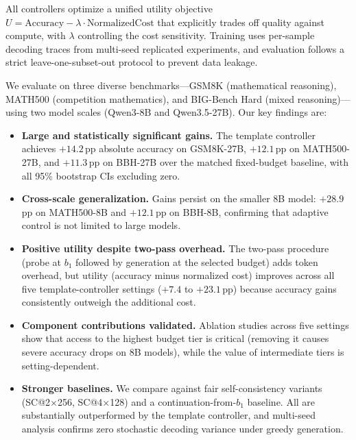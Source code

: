 All controllers optimize a unified utility objective $U = \text{Accuracy} - \lambda \cdot \text{NormalizedCost}$ that explicitly trades off quality against compute, with $\lambda$ controlling the cost sensitivity.
Training uses per-sample decoding traces from multi-seed replicated experiments, and evaluation follows a strict leave-one-subset-out protocol to prevent data leakage.

We evaluate \adathink{} on three diverse benchmarks---GSM8K (mathematical reasoning), MATH500 (competition mathematics), and BIG-Bench Hard (mixed reasoning)---using two model scales (Qwen3-8B and Qwen3.5-27B).
Our key findings are:
\begin{itemize}[nosep,leftmargin=*]
    \item \textbf{Large and statistically significant gains.}
    The template controller achieves $+14.2$\,pp absolute accuracy on GSM8K-27B, $+12.1$\,pp on MATH500-27B, and $+11.3$\,pp on BBH-27B over the matched fixed-budget baseline, with all 95\% bootstrap CIs excluding zero.
    \item \textbf{Cross-scale generalization.}
    Gains persist on the smaller 8B model: $+28.9$\,pp on MATH500-8B and $+12.1$\,pp on BBH-8B, confirming that adaptive control is not limited to large models.
    \item \textbf{Positive utility despite two-pass overhead.}
    The two-pass procedure (probe at $b_1$ followed by generation at the selected budget) adds token overhead, but utility (accuracy minus normalized cost) improves across all five template-controller settings ($+7.4$ to $+23.1$\,pp) because accuracy gains consistently outweigh the additional cost.
    \item \textbf{Component contributions validated.}
    Ablation studies across five settings show that access to the highest budget tier is critical (removing it causes severe accuracy drops on 8B models), while the value of intermediate tiers is setting-dependent.
    \item \textbf{Stronger baselines.}
    We compare against fair self-consistency variants (SC@2$\times$256, SC@4$\times$128) and a continuation-from-$b_1$ baseline. All are substantially outperformed by the template controller, and multi-seed analysis confirms zero stochastic decoding variance under greedy generation.
\end{itemize}

